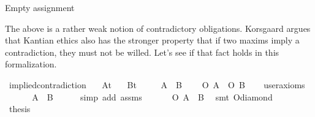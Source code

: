 \begin{isabellebody}
{  Empty assignment \color{black}%
}\isanewline
%
%
\endisatagproof
{\isafoldproof}%
%
\isadelimproof
%
\endisadelimproof
%
\begin{isamarkuptext}%
The above is a rather weak notion of contradictory obligations. Korsgaard \cite{KorsgaardFUL} argues that Kantian 
ethics also has the stronger property that if two maxims imply a contradiction, they must not be willed.
Let's see if that fact holds in this formalization.%
\end{isamarkuptext}\isamarkuptrue%
\isamarkupfalse%
\ implied{\isacharunderscore}contradiction{\isacharcolon}\isanewline
\ \ \ A{\isacharcolon}{\isacharcolon}{\isachardoublequoteopen}t{\isachardoublequoteclose}\isanewline
\ \ \ B{\isacharcolon}{\isacharcolon}{\isachardoublequoteopen}t{\isachardoublequoteclose}\ \isanewline
\ \ \ {\isachardoublequoteopen}{\isasymTurnstile}{\isacharparenleft}\isactrlbold {\isasymnot}\ {\isacharparenleft}A\ \isactrlbold {\isasymand}\ B{\isacharparenright}{\isacharparenright}{\isachardoublequoteclose}\isanewline
\ \ \ {\isachardoublequoteopen}{\isasymTurnstile}{\isacharparenleft}\isactrlbold {\isasymnot}\ {\isacharparenleft}O\ {\isacharbraceleft}A{\isacharbraceright}\ \isactrlbold {\isasymand}\ O\ {\isacharbraceleft}B{\isacharbraceright}{\isacharparenright}{\isacharparenright}{\isachardoublequoteclose}\isanewline
\ \ \isamarkupfalse%
\ {\isacharbrackleft}user{\isacharunderscore}axioms{\isacharbrackright}\isanewline
%
\isadelimproof
%
\endisadelimproof
%
\isatagproof
{}\isamarkupfalse%
\ {\isacharminus}\ \isanewline
\ \ \isamarkupfalse%
\ {\isachardoublequoteopen}{\isasymTurnstile}{\isacharparenleft}\isactrlbold {\isasymnot}{\isacharparenleft}{\isasymdiamond}{\isacharparenleft}A\ \isactrlbold {\isasymand}\ B{\isacharparenright}{\isacharparenright}{\isacharparenright}{\isachardoublequoteclose}\isanewline
\ \ \ \ \isamarkupfalse%
\ {\isacharparenleft}simp\ add{\isacharcolon}\ assms{\isacharparenright}\isanewline
\ \ \isamarkupfalse%
\ \isamarkupfalse%
\ {\isachardoublequoteopen}{\isasymTurnstile}{\isacharparenleft}\isactrlbold {\isasymnot}\ {\isacharparenleft}O\ {\isacharbraceleft}A\ \isactrlbold {\isasymand}\ B{\isacharbraceright}{\isacharparenright}{\isacharparenright}{\isachardoublequoteclose}\ \isamarkupfalse%
\ {\isacharparenleft}smt\ O{\isacharunderscore}diamond{\isacharparenright}\isanewline
%
\isanewline
\ \ \isamarkupfalse%
\ {\isacharquery}thesis\ \isamarkupfalse%
\isanewline
%
\end{isabellebody}
